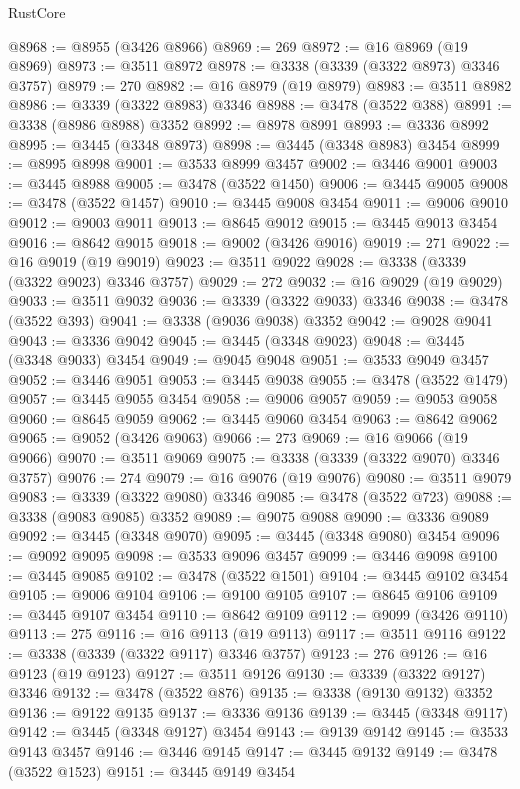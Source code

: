 \begin{lexlean}{RustCore}
\begin{coremodule}
@8968 := @8955 (@3426 @8966)
@8969 := 269
@8972 := @16 @8969 (@19 @8969)
@8973 := @3511 @8972
@8978 := @3338 (@3339 (@3322 @8973) @3346 @3757)
@8979 := 270
@8982 := @16 @8979 (@19 @8979)
@8983 := @3511 @8982
@8986 := @3339 (@3322 @8983) @3346
@8988 := @3478 (@3522 @388)
@8991 := @3338 (@8986 @8988) @3352
@8992 := @8978 @8991
@8993 := @3336 @8992
@8995 := @3445 (@3348 @8973)
@8998 := @3445 (@3348 @8983) @3454
@8999 := @8995 @8998
@9001 := @3533 @8999 @3457
@9002 := @3446 @9001
@9003 := @3445 @8988
@9005 := @3478 (@3522 @1450)
@9006 := @3445 @9005
@9008 := @3478 (@3522 @1457)
@9010 := @3445 @9008 @3454
@9011 := @9006 @9010
@9012 := @9003 @9011
@9013 := @8645 @9012
@9015 := @3445 @9013 @3454
@9016 := @8642 @9015
@9018 := @9002 (@3426 @9016)
@9019 := 271
@9022 := @16 @9019 (@19 @9019)
@9023 := @3511 @9022
@9028 := @3338 (@3339 (@3322 @9023) @3346 @3757)
@9029 := 272
@9032 := @16 @9029 (@19 @9029)
@9033 := @3511 @9032
@9036 := @3339 (@3322 @9033) @3346
@9038 := @3478 (@3522 @393)
@9041 := @3338 (@9036 @9038) @3352
@9042 := @9028 @9041
@9043 := @3336 @9042
@9045 := @3445 (@3348 @9023)
@9048 := @3445 (@3348 @9033) @3454
@9049 := @9045 @9048
@9051 := @3533 @9049 @3457
@9052 := @3446 @9051
@9053 := @3445 @9038
@9055 := @3478 (@3522 @1479)
@9057 := @3445 @9055 @3454
@9058 := @9006 @9057
@9059 := @9053 @9058
@9060 := @8645 @9059
@9062 := @3445 @9060 @3454
@9063 := @8642 @9062
@9065 := @9052 (@3426 @9063)
@9066 := 273
@9069 := @16 @9066 (@19 @9066)
@9070 := @3511 @9069
@9075 := @3338 (@3339 (@3322 @9070) @3346 @3757)
@9076 := 274
@9079 := @16 @9076 (@19 @9076)
@9080 := @3511 @9079
@9083 := @3339 (@3322 @9080) @3346
@9085 := @3478 (@3522 @723)
@9088 := @3338 (@9083 @9085) @3352
@9089 := @9075 @9088
@9090 := @3336 @9089
@9092 := @3445 (@3348 @9070)
@9095 := @3445 (@3348 @9080) @3454
@9096 := @9092 @9095
@9098 := @3533 @9096 @3457
@9099 := @3446 @9098
@9100 := @3445 @9085
@9102 := @3478 (@3522 @1501)
@9104 := @3445 @9102 @3454
@9105 := @9006 @9104
@9106 := @9100 @9105
@9107 := @8645 @9106
@9109 := @3445 @9107 @3454
@9110 := @8642 @9109
@9112 := @9099 (@3426 @9110)
@9113 := 275
@9116 := @16 @9113 (@19 @9113)
@9117 := @3511 @9116
@9122 := @3338 (@3339 (@3322 @9117) @3346 @3757)
@9123 := 276
@9126 := @16 @9123 (@19 @9123)
@9127 := @3511 @9126
@9130 := @3339 (@3322 @9127) @3346
@9132 := @3478 (@3522 @876)
@9135 := @3338 (@9130 @9132) @3352
@9136 := @9122 @9135
@9137 := @3336 @9136
@9139 := @3445 (@3348 @9117)
@9142 := @3445 (@3348 @9127) @3454
@9143 := @9139 @9142
@9145 := @3533 @9143 @3457
@9146 := @3446 @9145
@9147 := @3445 @9132
@9149 := @3478 (@3522 @1523)
@9151 := @3445 @9149 @3454

\end{coremodule}
\end{lexlean}
